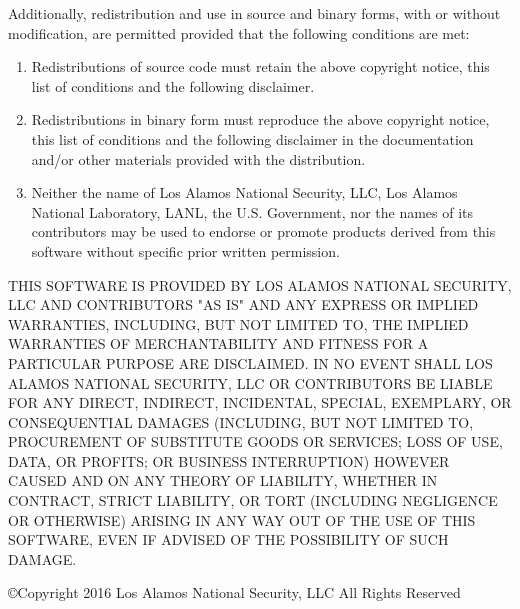 \documentclass[11pt,twoside]{NJOYMan}
\renewcommand{\headrulewidth}{0pt}     %
\renewcommand{\footrulewidth}{0pt}}    %
\begin{document}
Additionally, redistribution and use in source and binary forms, with
or without modification, are permitted provided that the following
conditions are met:
\begin{enumerate}
\item Redistributions of source code must retain the above copyright
notice, this list of conditions and the following disclaimer.
\item Redistributions in binary form must reproduce the above
copyright notice, this list of conditions and the following disclaimer
in the documentation and/or other materials provided with the
distribution.
\item Neither the name of Los Alamos National Security, LLC, Los
Alamos National Laboratory, LANL, the U.S. Government, nor the
names of its contributors may be used to endorse or promote products
derived from this software without specific prior written permission.
\end{enumerate}
THIS SOFTWARE IS PROVIDED BY LOS ALAMOS NATIONAL SECURITY,
LLC AND CONTRIBUTORS "AS IS" AND ANY EXPRESS OR IMPLIED WARRANTIES,
INCLUDING, BUT NOT LIMITED TO, THE IMPLIED WARRANTIES OF
MERCHANTABILITY AND FITNESS FOR A PARTICULAR PURPOSE ARE
DISCLAIMED. IN NO EVENT SHALL LOS ALAMOS NATIONAL SECURITY,
LLC OR CONTRIBUTORS BE LIABLE FOR ANY DIRECT, INDIRECT, INCIDENTAL,
SPECIAL, EXEMPLARY, OR CONSEQUENTIAL DAMAGES (INCLUDING, BUT NOT
LIMITED TO, PROCUREMENT OF SUBSTITUTE GOODS OR SERVICES; LOSS OF
USE, DATA, OR PROFITS; OR BUSINESS INTERRUPTION) HOWEVER CAUSED
AND ON ANY THEORY OF LIABILITY, WHETHER IN CONTRACT, STRICT
LIABILITY, OR TORT (INCLUDING NEGLIGENCE OR OTHERWISE) ARISING IN
ANY WAY OUT OF THE USE OF THIS SOFTWARE, EVEN IF ADVISED OF THE
POSSIBILITY OF SUCH DAMAGE.

\vspace{7.1in}
\begin{center}
\copyright Copyright 2016 Los Alamos National Security,
LLC All Rights Reserved
\end{center}
%

\newpage

\fancyhf{}
\fancyhead[RE,LO]{\slshape \leftmark}
\fancyfoot[RO,LE]{\thepage}
%
\renewcommand{\headrulewidth}{0.4pt}
\renewcommand{\footrulewidth}{0pt}

\setcounter{page}{4}
\end{document}
